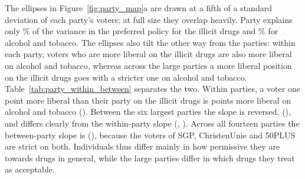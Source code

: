 \documentclass[11pt,a4paper]{article}
\begin{document}


The ellipses in Figure~\ref{fig:party_map}a are drawn at a fifth of a standard deviation of each party's voters; at full size they overlap heavily. Party explains only \pwbEtaIllicit\% of the variance in the preferred policy for the illicit drugs and \pwbEtaLegal\% for alcohol and tobacco. The ellipses also tilt the other way from the parties: within each party, voters who are more liberal on the illicit drugs are also more liberal on alcohol and tobacco, whereas across the large parties a more liberal position on the illicit drugs goes with a stricter one on alcohol and tobacco. Table~\ref{tab:party_within_between} separates the two. Within parties, a voter one point more liberal than their party on the illicit drugs is \pwbAllWithin{} points more liberal on alcohol and tobacco (\pwbAllWithinP). Between the six largest parties the slope is reversed, \pwbSixBetween{} (\pwbSixBetweenP), and differs clearly from the within-party slope (\pwbSixContext, \pwbSixContextP). Across all fourteen parties the between-party slope is \pwbAllBetween{} (\pwbAllBetweenP), because the voters of SGP, ChristenUnie and 50PLUS are strict on both. Individuals thus differ mainly in how permissive they are towards drugs in general, while the large parties differ in which drugs they treat as acceptable.





\end{document}
